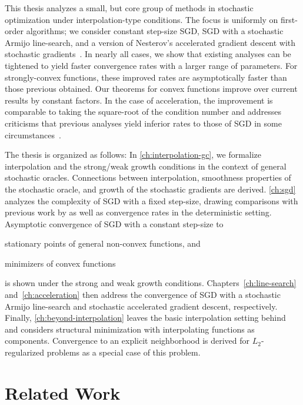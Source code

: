 This thesis analyzes a small, but core group of methods in stochastic optimization under interpolation-type conditions.
The focus is uniformly on first-order algorithms; we consider constant step-size \ac{SGD}, \ac{SGD} with a stochastic Armijo line-search, and a version of Nesterov's accelerated gradient descent with stochastic gradients~\citep{nesterov2004lectures}. 
In nearly all cases, we show that existing analyses can be tightened to yield faster convergence rates with a larger range of parameters. 
For strongly-convex functions, these improved rates are asymptotically faster than those previous obtained.
Our theorems for convex functions improve over current results by constant factors.
In the case of acceleration, the improvement is comparable to taking the square-root of the condition number and addresses criticisms that previous analyses yield inferior rates to those of \ac{SGD} in some circumstances~\cite{liu2020accelerating}. 

The thesis is organized as follows: 
In \autoref{ch:interpolation-gc}, we formalize interpolation and the strong/weak growth conditions in the context of general stochastic oracles. 
Connections between interpolation, smoothness properties of the stochastic oracle, and growth of the stochastic gradients are derived.
\autoref{ch:sgd} analyzes the complexity of \ac{SGD} with a fixed step-size, drawing comparisons with previous work by \citet{vaswani2019fast} as well as convergence rates in the deterministic setting. 
Asymptotic convergence of SGD with a constant step-size to
\begin{inparaenum}[(i)]
\item stationary points of general non-convex functions, and
\item minimizers of convex functions 
\end{inparaenum}
is shown under the strong and weak growth conditions.
Chapters~\ref{ch:line-search} and~\ref{ch:acceleration} then address the convergence of \ac{SGD} with a stochastic Armijo line-search and stochastic accelerated gradient descent, respectively. 
Finally, \autoref{ch:beyond-interpolation} leaves the basic interpolation setting behind and considers structural minimization with interpolating functions as components. 
Convergence to an explicit neighborhood is derived for \( L_2 \)-regularized problems as a special case of this problem. 

\section{Related Work}~\label{sec:related-work}


